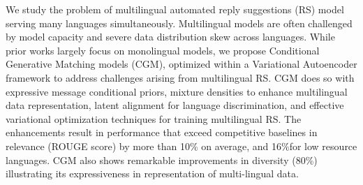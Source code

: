 We study  the  problem  of  multilingual  automated  reply  suggestions  (RS)  model  serving many languages simultaneously.  Multilingual models are often challenged by model capacity and  severe  data  distribution  skew  across  languages.   While  prior  works  largely  focus  on monolingual models, we propose Conditional Generative   Matching   models   (CGM),   optimized within a Variational Autoencoder framework to address challenges arising from multilingual  RS.  CGM  does  so  with  expressive message conditional priors, mixture densities to  enhance  multilingual  data  representation, latent  alignment  for  language  discrimination, and  effective  variational  optimization  techniques for training multilingual RS. The enhancements result in performance that exceed competitive  baselines  in  relevance  (ROUGE score) by more than 10\% on average, and 16\%for low resource languages.  CGM also shows remarkable  improvements  in  diversity  (80\%) illustrating its expressiveness in representation of multi-lingual data.
